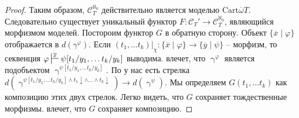 \documentclass[reqno]{amsart}
\theoremstyle{definition}
\theoremstyle{remark}
\newcommand{\cat}[1]{\mathcal{#1}}
\begin{document}
\begin{proof}
Таким образом, $\cat{C}_T^{\aleph_0}$ действительно является моделью $\mathrm{Cart} \overline{\omega} T$.
Следовательно существует уникальный функтор $F : \cat{C}_T' \to \cat{C}_T^{\aleph_0}$, являющийся морфизмом моделей.
Постороим функтор $G$ в обратную сторону.
Объект $\{ \overline{x} \mid \varphi \}$ отображается в $d(\gamma^\varphi)$.
Если $(t_1, \ldots t_k)|_\chi : \{ \overline{x} \mid \varphi \} \to \{ \overline{y} \mid \psi \}$ -- морфизм, то секвенция $\varphi \sststile{}{\overline{x}} \psi[t_1/y_1, \ldots t_k/y_k]$ выводима.
 влечет, что $\upgamma^\varphi$ является подобъектом $\upgamma^{\psi[t_1/y_1, \ldots t_k/y_k]}$.
По  у нас есть стрелка $d(\upgamma^{\psi[t_1/y_1, \ldots t_k/y_k] \land t_1\!\downarrow \land \ldots \land t_k\!\downarrow}) \to d(\upgamma^\psi)$.
Мы определяем $G(t_1, \ldots t_k)$ как композицию этих двух стрелок.
Легко видеть, что $G$ сохраняет тождественные морфизмы.
 влечет, что $G$ сохраняет композицию.


\end{proof}
\end{document}
